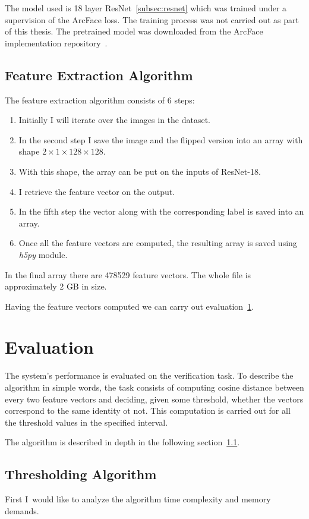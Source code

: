The model used is 18 layer ResNet~\ref{subsec:resnet} which was trained under a supervision of the ArcFace loss.
The training process was not carried out as part of this thesis.
The pretrained model was downloaded from the ArcFace implementation repository~\cite{ArcFacePyTorch}.

\subsection{Feature Extraction Algorithm}\label{subsec:feexalgo}
The feature extraction algorithm consists of 6 steps:
\begin{enumerate}
    \item Initially I will iterate over the images in the dataset.
    \item In the second step I save the image and the flipped version into an array
    with shape $2\times1\times128\times128$.
    \item With this shape, the array can be put on the inputs of ResNet-18.
    \item I retrieve the feature vector on the output.
    \item In the fifth step the vector along with the corresponding label is saved into an array.
    \item Once all the feature vectors are computed, the resulting array is saved using \textit{h5py} module.
\end{enumerate}

In the final array there are 478529 feature vectors.
The whole file is approximately 2 GB in size.

Having the feature vectors computed we can carry out evaluation~\ref{sec:evaluation}.

\section{Evaluation}\label{sec:evaluation}
The system's performance is evaluated on the verification task.
To describe the algorithm in simple words, the task consists of computing cosine distance between every two feature
vectors and deciding, given some threshold, whether the vectors correspond to the same identity ot not.
This computation is carried out for all the threshold values in the specified interval.

The algorithm is described in depth in the following section~\ref{subsec:thresholding-algorithm}.

\subsection{Thresholding Algorithm}\label{subsec:thresholding-algorithm}
First I would like to analyze the algorithm time complexity and memory demands.


